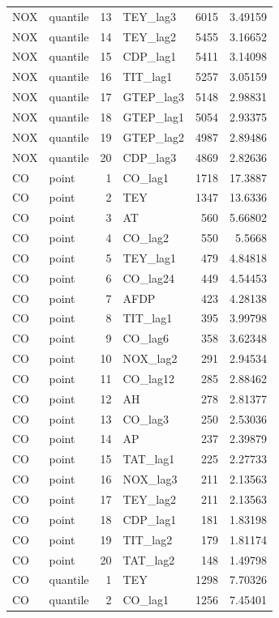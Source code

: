\begin{tabular}{llrlrr}
NOX & quantile & 13 & TEY\_lag3 & 6015 & 3.49159 \\
NOX & quantile & 14 & TEY\_lag2 & 5455 & 3.16652 \\
NOX & quantile & 15 & CDP\_lag1 & 5411 & 3.14098 \\
NOX & quantile & 16 & TIT\_lag1 & 5257 & 3.05159 \\
NOX & quantile & 17 & GTEP\_lag3 & 5148 & 2.98831 \\
NOX & quantile & 18 & GTEP\_lag1 & 5054 & 2.93375 \\
NOX & quantile & 19 & GTEP\_lag2 & 4987 & 2.89486 \\
NOX & quantile & 20 & CDP\_lag3 & 4869 & 2.82636 \\
CO & point & 1 & CO\_lag1 & 1718 & 17.3887 \\
CO & point & 2 & TEY & 1347 & 13.6336 \\
CO & point & 3 & AT & 560 & 5.66802 \\
CO & point & 4 & CO\_lag2 & 550 & 5.5668 \\
CO & point & 5 & TEY\_lag1 & 479 & 4.84818 \\
CO & point & 6 & CO\_lag24 & 449 & 4.54453 \\
CO & point & 7 & AFDP & 423 & 4.28138 \\
CO & point & 8 & TIT\_lag1 & 395 & 3.99798 \\
CO & point & 9 & CO\_lag6 & 358 & 3.62348 \\
CO & point & 10 & NOX\_lag2 & 291 & 2.94534 \\
CO & point & 11 & CO\_lag12 & 285 & 2.88462 \\
CO & point & 12 & AH & 278 & 2.81377 \\
CO & point & 13 & CO\_lag3 & 250 & 2.53036 \\
CO & point & 14 & AP & 237 & 2.39879 \\
CO & point & 15 & TAT\_lag1 & 225 & 2.27733 \\
CO & point & 16 & NOX\_lag3 & 211 & 2.13563 \\
CO & point & 17 & TEY\_lag2 & 211 & 2.13563 \\
CO & point & 18 & CDP\_lag1 & 181 & 1.83198 \\
CO & point & 19 & TIT\_lag2 & 179 & 1.81174 \\
CO & point & 20 & TAT\_lag2 & 148 & 1.49798 \\
CO & quantile & 1 & TEY & 1298 & 7.70326 \\
CO & quantile & 2 & CO\_lag1 & 1256 & 7.45401 \\

\end{tabular}
